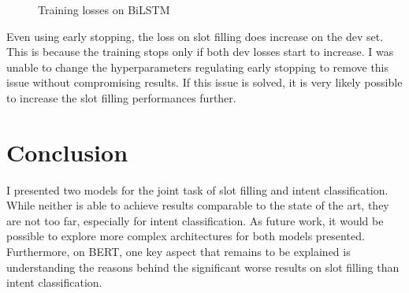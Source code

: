 \documentclass[a4paper]{article}
\begin{document}
\begin{figure}[h!]
\begin{subfigure}[b]{0.20\textwidth}
	\end{subfigure}
 \caption{Training losses on BiLSTM}
 \label{fig:losses}
\end{figure}

Even using early stopping, the loss on slot filling does increase on the dev set. This is because the training stops only if both dev losses start to increase. I was unable to change the hyperparameters regulating early stopping to remove this issue without compromising results. If this issue is solved, it is very likely possible to increase the slot filling performances further.
\section{Conclusion}

I presented two models for the joint task of slot filling and intent classification. While neither is able to achieve results comparable to the state of the art, they are not too far, especially for intent classification.
As future work, it would be possible to explore more complex architectures for both models presented. Furthermore, on BERT, one key aspect that remains to be explained is understanding the reasons behind the significant worse results on slot filling than intent classification.




%
%
\end{document}

